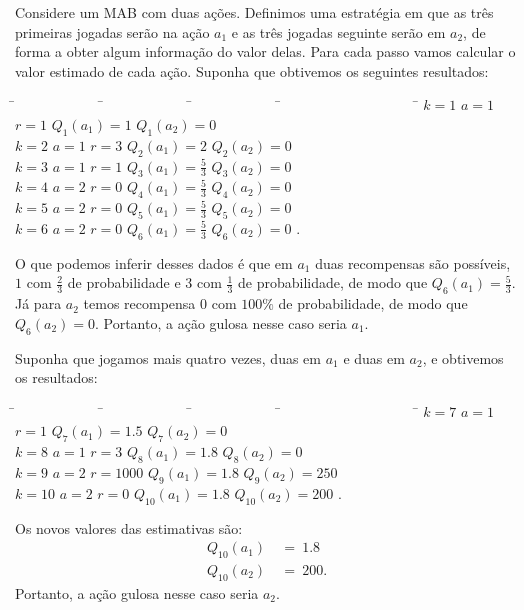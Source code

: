 \documentclass{article}
\begin{document}
            Considere um MAB com duas ações. Definimos uma estratégia em que as três primeiras jogadas serão na ação $a_1$ e as três jogadas seguinte serão em $a_2$, de forma a obter algum informação do valor delas. Para cada passo vamos calcular o valor estimado de cada ação. Suponha que obtivemos os seguintes resultados:
            \begin{tabbing}
                \hspace{4.0cm}\=~~~~~~~~~~~~ \=~~~~~~~~~~~~ \=~~~~~~~~~~~~ \=~~~~~~~~~~~~~~~~~~~ \= \kill
                \> $k = 1$   \> $a = 1$   \> $r = 1$   \> $Q_1(a_1) = 1$           \> $Q_1(a_2) = 0$\\
                \> $k = 2$   \> $a = 1$   \> $r = 3$   \> $Q_2(a_1) = 2$           \> $Q_2(a_2) = 0$\\
                \> $k = 3$   \> $a = 1$   \> $r = 1$   \> $Q_3(a_1) = \frac{5}{3}$ \> $Q_3(a_2) = 0$\\
                \> $k = 4$   \> $a = 2$   \> $r = 0$   \> $Q_4(a_1) = \frac{5}{3}$ \> $Q_4(a_2) = 0$\\
                \> $k = 5$   \> $a = 2$   \> $r = 0$   \> $Q_5(a_1) = \frac{5}{3}$ \> $Q_5(a_2) = 0$\\
                \> $k = 6$   \> $a = 2$   \> $r = 0$   \> $Q_6(a_1) = \frac{5}{3}$ \> $Q_6(a_2) = 0$ .
            \end{tabbing}
            O que podemos inferir desses dados é que em $a_1$ duas recompensas são possíveis, $1$ com $\frac{2}{3}$ de probabilidade e $3$ com $\frac{1}{3}$ de probabilidade, de modo que $Q_6(a_1) = \frac{5}{3}$. Já para $a_2$ temos recompensa $0$ com $100\%$ de probabilidade, de modo que $Q_6(a_2) = 0$. Portanto, a ação gulosa nesse caso seria $a_1$.
            
            Suponha que jogamos mais quatro vezes, duas em $a_1$ e duas em $a_2$, e obtivemos os resultados:
            \begin{tabbing}
                \hspace{4.0cm}\=~~~~~~~~~~~~ \=~~~~~~~~~~~~ \=~~~~~~~~~~~~ \=~~~~~~~~~~~~~~~~~~~ \= \kill
                \> $k = 7$   \> $a = 1$   \> $r = 1$   \> $Q_7(a_1) = 1.5$  \> $Q_7(a_2) = 0$\\
                \> $k = 8$   \> $a = 1$   \> $r = 3$   \> $Q_8(a_1) = 1.8$  \> $Q_8(a_2) = 0$\\
                \> $k = 9$   \> $a = 2$   \> $r = 1000$\> $Q_9(a_1) = 1.8$  \> $Q_9(a_2) = 250$\\
                \> $k = 10$  \> $a = 2$   \> $r = 0$   \> $Q_{10}(a_1) = 1.8$ \> $Q_{10}(a_2) = 200$ .
            \end{tabbing}
            Os novos valores das estimativas são:
            \begin{equation*}
            \begin{split}
                Q_{10}(a_1) & \ = \ 1.8\\
                Q_{10}(a_2) & \ = \ 200 .
            \end{split}
            \end{equation*}
            Portanto, a ação gulosa nesse caso seria $a_2$. 
            
\end{document}

